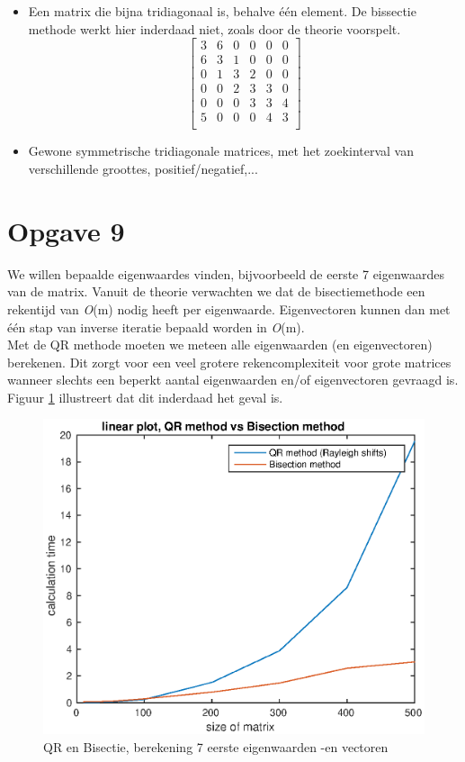 \documentclass[]{article}
\newcommand{\opgave}[1]{\pagebreak\section*{Opgave #1}}
\begin{document}
\begin{itemize}
	\item Een matrix die bijna tridiagonaal is, behalve \'{e}\'{e}n element. De bissectie methode werkt hier inderdaad niet, zoals door de theorie voorspelt.
	\[ \left[	\begin{array}{llllll}
3&6&0&0&0&0\\
6&3&1&0&0&0\\
0&1&3&2&0&0\\
0&0&2&3&3&0\\
0&0&0&3&3&4\\
5&0&0&0&4&3\\
\end{array}	\right] \]

	\item Gewone symmetrische tridiagonale matrices, met het zoekinterval van verschillende groottes, positief/negatief,...
\end{itemize}

\opgave{9}
We willen bepaalde eigenwaardes vinden, bijvoorbeeld de eerste 7 eigenwaardes van de matrix. Vanuit de theorie verwachten we dat de bisectiemethode een rekentijd van \textit{O}(m) nodig heeft per eigenwaarde. Eigenvectoren kunnen dan met \'{e}\'{e}n stap van inverse iteratie bepaald worden in \textit{O}(m).\\
Met de QR methode moeten we meteen alle eigenwaarden (en eigenvectoren) berekenen. Dit zorgt voor een veel grotere rekencomplexiteit voor grote matrices wanneer slechts een beperkt aantal eigenwaarden en/of eigenvectoren gevraagd is.
Figuur \ref{opgave9} illustreert dat dit inderdaad het geval is.

\begin{figure}[h]
\begin{center}
\includegraphics[width=1\textwidth]{opgave9lin.eps}
\end{center}
\caption{QR en Bisectie, berekening 7 eerste eigenwaarden -en vectoren}
\label{opgave9}
\end{figure}
\end{document}
